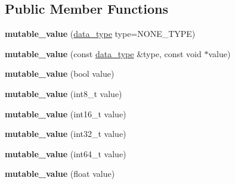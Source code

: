 \subsection*{Public Member Functions}
\begin{DoxyCompactItemize}
\item 
\mbox{\label{classdialog_1_1mutable__value_af695c5b26c447cdeac8b5e3a78fff53d}} 
{\bfseries mutable\+\_\+value} (\hyperlink{structdialog_1_1data__type}{data\+\_\+type} type=N\+O\+N\+E\+\_\+\+T\+Y\+PE)
\item 
\mbox{\label{classdialog_1_1mutable__value_a2f29974b74f4075f5518970828f49935}} 
{\bfseries mutable\+\_\+value} (const \hyperlink{structdialog_1_1data__type}{data\+\_\+type} \&type, const void $\ast$value)
\item 
\mbox{\label{classdialog_1_1mutable__value_acbd3f344366cc35d75dc83783cb58c22}} 
{\bfseries mutable\+\_\+value} (bool value)
\item 
\mbox{\label{classdialog_1_1mutable__value_a21f1039a8b21ef42b795c99ece668b18}} 
{\bfseries mutable\+\_\+value} (int8\+\_\+t value)
\item 
\mbox{\label{classdialog_1_1mutable__value_a243c36a8bcaff0efb48078d1da0ce0e8}} 
{\bfseries mutable\+\_\+value} (int16\+\_\+t value)
\item 
\mbox{\label{classdialog_1_1mutable__value_ad15529ed7c5e43c79afea685979d329f}} 
{\bfseries mutable\+\_\+value} (int32\+\_\+t value)
\item 
\mbox{\label{classdialog_1_1mutable__value_a1b691434877e4c601aa4b20d28536888}} 
{\bfseries mutable\+\_\+value} (int64\+\_\+t value)
\item 
\mbox{\label{classdialog_1_1mutable__value_ab95cf82769c1bc446ce0bc0a9cdc9c13}} 
{\bfseries mutable\+\_\+value} (float value)
\item 
\mbox{\label{classdialog_1_1mutable__value_a485a10a14e3ebb08240d88a715d52e9f}} 

\end{DoxyCompactItemize}
